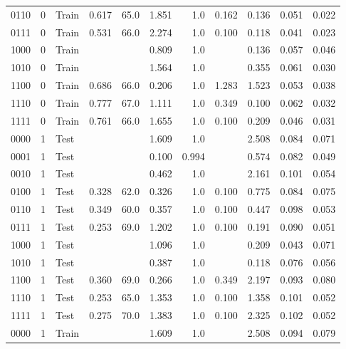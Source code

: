 \begin{longtable}{lllrrrrrrrr}
   0110 &       0 &   Train &    0.617 & 65.0 &     1.851 & 1.0 & 0.162 &          0.136 & 0.051 & 0.022 \\
   0111 &       0 &   Train &    0.531 & 66.0 &     2.274 & 1.0 & 0.100 &          0.118 & 0.041 & 0.023 \\
   1000 &       0 &   Train &       &     &     0.809 & 1.0 &    &          0.136 & 0.057 & 0.046 \\
   1010 &       0 &   Train &       &     &     1.564 & 1.0 &    &          0.355 & 0.061 & 0.030 \\
   1100 &       0 &   Train &    0.686 & 66.0 &     0.206 & 1.0 & 1.283 &          1.523 & 0.053 & 0.038 \\
   1110 &       0 &   Train &    0.777 & 67.0 &     1.111 & 1.0 & 0.349 &          0.100 & 0.062 & 0.032 \\
   1111 &       0 &   Train &    0.761 & 66.0 &     1.655 & 1.0 & 0.100 &          0.209 & 0.046 & 0.031 \\
   0000 &       1 &  Test &       &     &     1.609 & 1.0 &    &          2.508 & 0.084 & 0.071 \\
   0001 &       1 &  Test &       &     &     0.100 & 0.994 &    &          0.574 & 0.082 & 0.049 \\
   0010 &       1 &  Test &       &     &     0.462 & 1.0 &    &          2.161 & 0.101 & 0.054 \\
   0100 &       1 &  Test &    0.328 & 62.0 &     0.326 & 1.0 & 0.100 &          0.775 & 0.084 & 0.075 \\
   0110 &       1 &  Test &    0.349 & 60.0 &     0.357 & 1.0 & 0.100 &          0.447 & 0.098 & 0.053 \\
   0111 &       1 &  Test &    0.253 & 69.0 &     1.202 & 1.0 & 0.100 &          0.191 & 0.090 & 0.051 \\
   1000 &       1 &  Test &       &     &     1.096 & 1.0 &    &          0.209 & 0.043 & 0.071 \\
   1010 &       1 &  Test &       &     &     0.387 & 1.0 &    &          0.118 & 0.076 & 0.056 \\
   1100 &       1 &  Test &    0.360 & 69.0 &     0.266 & 1.0 & 0.349 &          2.197 & 0.093 & 0.080 \\
   1110 &       1 &  Test &    0.253 & 65.0 &     1.353 & 1.0 & 0.100 &          1.358 & 0.101 & 0.052 \\
   1111 &       1 &  Test &    0.275 & 70.0 &     1.383 & 1.0 & 0.100 &          2.325 & 0.102 & 0.052 \\
   0000 &       1 &   Train &       &     &     1.609 & 1.0 &    &          2.508 & 0.094 & 0.079 \\

\end{longtable}
